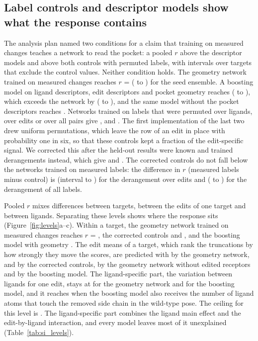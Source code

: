 \subsection{Label controls and descriptor models show what the response contains}

The analysis plan named two conditions for a claim that training on measured changes teaches a network to read the pocket: a pooled $r$ above the descriptor models and above both controls with permuted labels, with intervals over targets that exclude the control values. Neither condition holds. The geometry network trained on measured changes reaches $r$ = \rEnsRsgInt{} (\rLoRsgInt{} to \rHiRsgInt{}) for the seed ensemble. A boosting model on ligand descriptors, edit descriptors and pocket geometry reaches \rEnsGbmGeo{} (\rLoGbmGeo{} to \rHiGbmGeo{}), which exceeds the network by \diffGbmGeoMinusRsgInt{} (\diffLoGbmGeoMinusRsgInt{} to \diffHiGbmGeoMinusRsgInt{}), and the same model without the pocket descriptors reaches \rEnsGbmDesc{}. Networks trained on labels that were permuted over ligands, over edits or over all pairs give \rEnsRsgShl{}, \rEnsRsgShm{} and \rEnsRsgSha{}. The first implementation of the last two drew uniform permutations, which leave the row of an edit in place with probability one in six, so that these controls kept a fraction of the edit-specific signal. We corrected this after the held-out results were known and trained derangements instead, which give \rEnsRsgShmTwo{} and \rEnsRsgShaTwo{}. The corrected controls do not fall below the networks trained on measured labels: the difference in $r$ (measured labels minus control) is \diffRsgIntMinusRsgShmTwo{} (interval \diffLoRsgIntMinusRsgShmTwo{} to \diffHiRsgIntMinusRsgShmTwo{}) for the derangement over edits and \diffRsgIntMinusRsgShaTwo{} (\diffLoRsgIntMinusRsgShaTwo{} to \diffHiRsgIntMinusRsgShaTwo{}) for the derangement of all labels.

Pooled $r$ mixes differences between targets, between the edits of one target and between ligands. Separating these levels shows where the response sits (Figure~\ref{fig:levels}a--c). Within a target, the geometry network trained on measured changes reaches $r$ = \lvTargetRsgInt{}, the corrected controls \lvTargetRsgShmTwo{} and \lvTargetRsgShaTwo{}, and the boosting model with geometry \lvTargetGbmGeo{}. The edit means of a target, which rank the truncations by how strongly they move the scores, are predicted with \lvEditRsgInt{} by the geometry network, \lvEditRsgShmTwo{} and \lvEditRsgShaTwo{} by the corrected controls, \lvEditRsgWt{} by the geometry network without edited receptors and \lvEditGbmGeo{} by the boosting model. The ligand-specific part, the variation between ligands for one edit, stays at \lvLigRsgInt{} for the geometry network and \lvLigGbmGeo{} for the boosting model, and it reaches \lvLigGbmPoseGeo{} when the boosting model also receives the number of ligand atoms that touch the removed side chain in the wild-type pose. The ceiling for this level is \ceilLig{}. The ligand-specific part combines the ligand main effect and the edit-by-ligand interaction, and every model leaves most of it unexplained (Table~\ref{tab:si_levels}).

